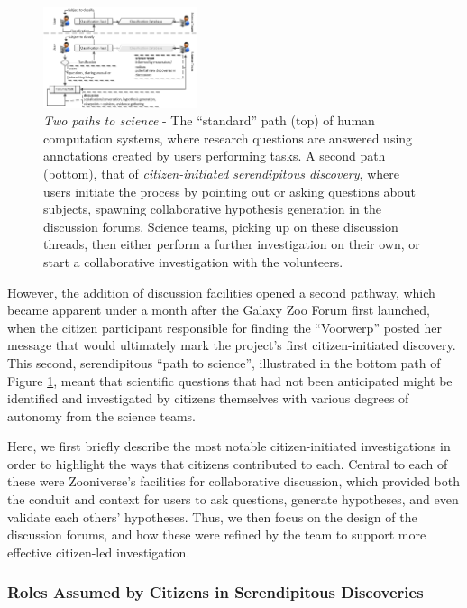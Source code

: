\documentclass{sigchi}
\begin{document}
\begin{figure}[htbp]
\centering
\includegraphics[width=0.4\textwidth]{imgs/two_paths_2.png}
\caption{\emph{Two paths to science} - The ``standard'' path (top) of human computation systems, where research questions are answered using annotations created by users performing tasks.  A second path (bottom), that of \emph{citizen-initiated serendipitous discovery}, where users initiate the process by pointing out or asking questions about subjects, spawning collaborative hypothesis generation in the discussion forums. Science teams, picking up on these discussion threads, then either perform a further investigation on their own, or start a collaborative investigation with the volunteers.}
\label{fig:twopaths}
\end{figure}

However, the addition of discussion facilities opened a second pathway, which became apparent under a month after the Galaxy Zoo Forum first launched, when the citizen participant responsible for finding the ``Voorwerp'' posted her message that would ultimately mark the project's first citizen-initiated discovery.  This second, serendipitous ``path to science'', illustrated in the bottom path of Figure \ref{fig:twopaths}, meant that scientific questions that had not been anticipated might be identified and investigated by citizens themselves with various degrees of autonomy from the science teams.

Here, we first briefly describe the most notable citizen-initiated investigations in order to highlight the ways that citizens contributed to each.  Central to each of these were Zooniverse's facilities for collaborative discussion, which provided both the conduit and  context for users to ask questions, generate hypotheses, and even validate each others' hypotheses.  Thus, we then focus on the design of the discussion forums, and how these were refined by the team to support more effective citizen-led investigation. 

\subsubsection{Roles Assumed by Citizens in Serendipitous Discoveries}
\end{document}
